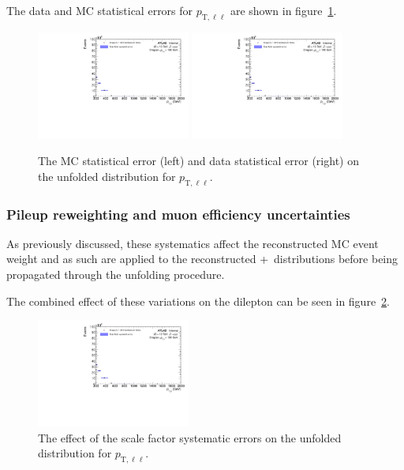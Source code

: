 The data and MC statistical errors for $p_{\text{T},\ell\ell}$ are shown in figure~\ref{fig:MCDataStatErr}.

\begin{figure}[h!]
  \centering
  \includegraphics[page=26,width=0.45\textwidth]{figures/unfoldErrPlots.pdf}
  \includegraphics[page=27,width=0.45\textwidth]{figures/unfoldErrPlots.pdf}
  \caption{The MC statistical error (left) and data statistical error (right) on the unfolded distribution for $p_{\text{T},\ell\ell}$.}
  \label{fig:MCDataStatErr}
\end{figure}

\subsubsection{Pileup reweighting and muon efficiency uncertainties}
As previously discussed, these systematics affect the reconstructed MC event weight and as such are applied to the reconstructed \powheg+\pythia~distributions before being propagated through the unfolding procedure.

The combined effect of these variations on the dilepton \pt can be seen in figure~\ref{fig:SFSystErr}.

\begin{figure}[h!]
  \centering
  \includegraphics[page=22,width=0.45\textwidth]{figures/unfoldErrPlots.pdf}
  \caption{The effect of the scale factor systematic errors on the unfolded distribution for $p_{\text{T},\ell\ell}$.}
  \label{fig:SFSystErr}
\end{figure}

